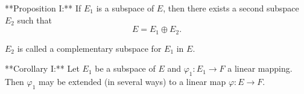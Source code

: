 **Proposition I:** If $E_1$ is a subspace of $E$, then there exists a second subspace $E_2$ such that
$$E = E_1 \oplus E_2.$$

$E_2$ is called a complementary subspace for $E_1$ in $E$.

**Corollary I:** Let $E_1$ be a subspace of $E$ and $\varphi_1: E_1 \to F$ a linear mapping. Then $\varphi_1$ may be extended (in several ways) to a linear map $\varphi: E \to F$.
